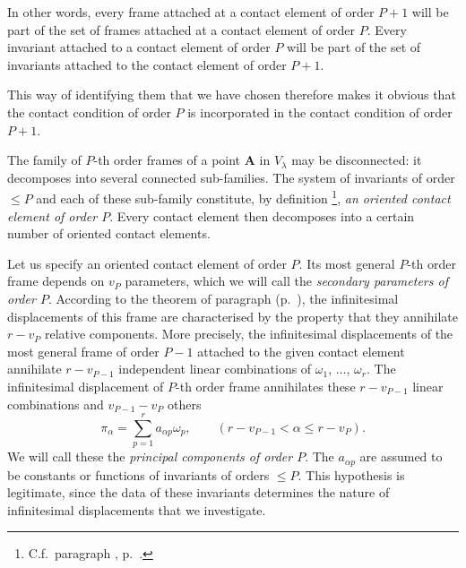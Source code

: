\somespace

{\small
In other words, every frame attached at a contact element of order $P+1$ will be part of the set of frames attached at a contact element of order $P$. Every invariant attached to a contact element of order $P$ will be part of the set of invariants attached to the contact element of order $P+1$.

This way of identifying them that we have chosen therefore makes it obvious that the contact condition of order $P$ is incorporated in the contact condition of order $P+1$.
}

\somespace

The family of $P$-th order frames of a point $\mathbf{A}$ in $V_{\lambda}$ may be disconnected: it decomposes into several connected sub-families. The system of invariants of order $\le P$ and each of these sub-family constitute, by definition \footnote{C.f.~paragraph , p.~\pageref{sec:93}.}, \emph{an oriented contact element of order $P$}. Every contact element then decomposes into a certain number of oriented contact elements.

Let us specify an oriented contact element of order $P$. Its most general $P$-th order frame depends on $v_{P}$ parameters, which we will call the \emph{secondary parameters of order $P$}. According to the theorem of paragraph  (p.~\pageref{sec:123}), the infinitesimal displacements of this frame are characterised by the property that they annihilate $r-v_{P}$ relative components. More precisely, the infinitesimal displacements of the most general frame of order $P-1$ attached to the given contact element annihilate $r-v_{P-1}$ independent linear combinations of $\omega_{1}$, $\dots$, $\omega_{r}$. The infinitesimal displacement of $P$-th order frame annihilates these $r-v_{P-1}$ linear combinations and $v_{P-1}-v_{P}$ others
\begin{equation}
  \label{eq:10.1}
  \pi_{\alpha}=\sum_{p=1}^{r}a_{\alpha p}\omega_{p},\qquad(r-v_{P-1}<\alpha\le r-v_{P}).
\end{equation}
We will call these the \emph{principal components of order $P$}. The $a_{\alpha p}$ are assumed to be constants or functions of invariants of orders $\le P$. This hypothesis is legitimate, since the data of these invariants determines the nature of infinitesimal displacements that we investigate.

